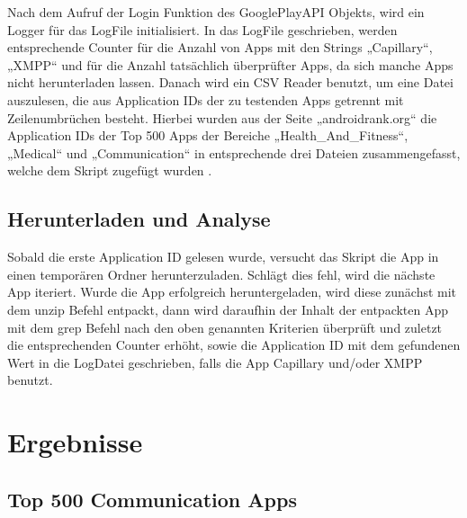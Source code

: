 \documentclass[sigconf]{acmart}
\begin{document}
Nach dem Aufruf der Login Funktion des GooglePlayAPI Objekts, 
wird ein Logger für das LogFile initialisiert. In das LogFile geschrieben, werden 
entsprechende Counter für die Anzahl von Apps mit den 
Strings „Capillary“, „XMPP“ und für die Anzahl tatsächlich überprüfter Apps, da sich 
manche Apps nicht herunterladen lassen.
Danach wird ein CSV Reader benutzt, um eine Datei auszulesen, die aus 
Application IDs der zu testenden Apps getrennt mit Zeilenumbrüchen besteht. 
Hierbei wurden aus der Seite „androidrank.org“ die Application IDs der Top 500 
Apps der Bereiche „Health\_And\_Fitness“, „Medical“ und „Communication“ in entsprechende 
drei Dateien zusammengefasst, welche dem Skript zugefügt wurden \cite{androidrank}\cite{androidrank1}\cite{androidrank2}.

\subsection{Herunterladen und Analyse}
Sobald die erste Application ID gelesen wurde, versucht das Skript die App 
in einen temporären Ordner herunterzuladen. Schlägt dies fehl, wird die 
nächste App iteriert. Wurde die App erfolgreich heruntergeladen, wird diese 
zunächst mit dem unzip Befehl entpackt, dann wird daraufhin der Inhalt der 
entpackten App mit dem grep Befehl nach den oben genannten Kriterien 
überprüft und zuletzt die entsprechenden Counter erhöht, sowie die 
Application ID mit dem gefundenen Wert in die LogDatei geschrieben, falls 
die App Capillary und/oder XMPP benutzt.

\section{Ergebnisse}

\subsection{Top 500 Communication Apps}
\end{document}
